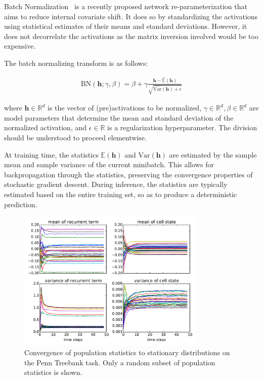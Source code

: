 \documentclass{article} %
\newcommand{\vect}[1]{\mathbf{#1}}
\newcommand{\reals}{\mathbb{R}}
\begin{document}
Batch Normalization~\cite{batchnorm} is a recently proposed network re-parameterization that aims to reduce internal covariate shift.
It does so by standardizing the activations using statistical estimates of their means and standard deviations.
However, it does not decorrelate the activations as the matrix inversion involved would be too expensive.

The batch normalizing transform is as follows:

\begin{align}
\mathrm{BN}(\vect{h}; \gamma, \beta) =
  \beta + \gamma
  \frac{\vect{h} -   \widehat{\mathbb{E  }}(\vect{h})}
       {       \sqrt{\widehat{\mathrm{Var}}(\vect{h}) + \epsilon}}
\end{align}

where $\vect{h} \in \reals^d$ is the vector of (pre)activations to be normalized, $\gamma \in \reals^d, \beta \in \reals^d$ are model parameters that determine the mean and standard deviation of the normalized activation, and $\epsilon \in \reals$ is a regularization hyperparameter.
The division should be understood to proceed elementwise.

At training time, the statistics $\mathbb{E}(\vect{h})$ and $\mathrm{Var}(\vect{h})$ are estimated by the sample mean and sample variance of the current minibatch.
This allows for backpropagation through the statistics, preserving the convergence properties of stochastic gradient descent.
During inference, the statistics are typically estimated based on the entire training set, so as to produce a deterministic prediction.

\begin{figure}[!ht]
\center
\includegraphics[width=0.8\textwidth]{figures/popstat_stationarity.pdf}
\caption{Convergence of population statistics to stationary distributions on the Penn Treebank task. Only a random subset of population statistics is shown.}
\label{fig:popstat_stationarity}
\end{figure}
\end{document}
